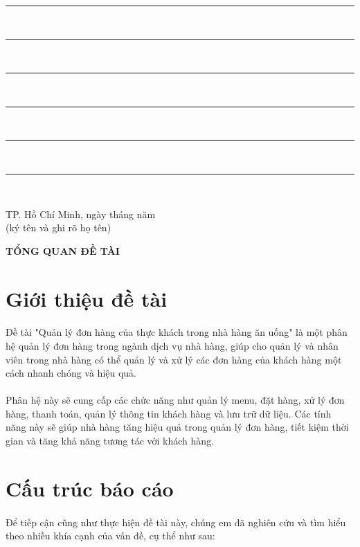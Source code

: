 \documentclass{report}
\newcommand\tab[1][1.25cm]{\hspace*{#1}}
\begin{document}
\rule{17cm}{1pt}\\
\rule{17cm}{1pt}\\
\rule{17cm}{1pt}\\
\rule{17cm}{1pt}\\
\rule{17cm}{1pt}\\
\rule{17cm}{1pt}\\
\begin{flushright}
	TP. Hồ Chí Minh, ngày \tab[1cm] tháng \tab[1cm] năm \tab[1cm]\tab \\
	(ký tên và ghi rõ họ tên)\tab[2cm] \\
	\vspace{1.5cm}
\end{flushright}
\pagebreak
\pagestyle{fancy}
\fancyhf{}
\chead{\thepage}
\renewcommand{\headrulewidth}{0pt}
\begin{center}
	\fontsize{16}{20}\selectfont
	\textbf{TỔNG QUAN ĐỀ TÀI} 
\end{center}
	\fontsize{13}{15}\selectfont
	\section*{Giới thiệu đề tài}
	\paragraph{}
        Đề tài "Quản lý đơn hàng của thực khách trong nhà hàng ăn uống" là một phân hệ quản lý đơn hàng trong ngành dịch vụ nhà hàng, giúp cho quản lý và nhân viên trong nhà hàng có thể quản lý và xử lý các đơn hàng của khách hàng một cách nhanh chóng và hiệu quả.
	\paragraph{}
        Phân hệ này sẽ cung cấp các chức năng như quản lý menu, đặt hàng, xử lý đơn hàng, thanh toán, quản lý thông tin khách hàng và lưu trữ dữ liệu. Các tính năng này sẽ giúp nhà hàng tăng hiệu quả trong quản lý đơn hàng, tiết kiệm thời gian và tăng khả năng tương tác với khách hàng.

	\section*{Cấu trúc báo cáo}
	\paragraph{}
	Để tiếp cận cũng như thực hiện đề tài này, chúng em đã nghiên cứu và tìm hiểu theo nhiều khía cạnh của vấn đề, cụ thể như sau:
\end{document}
